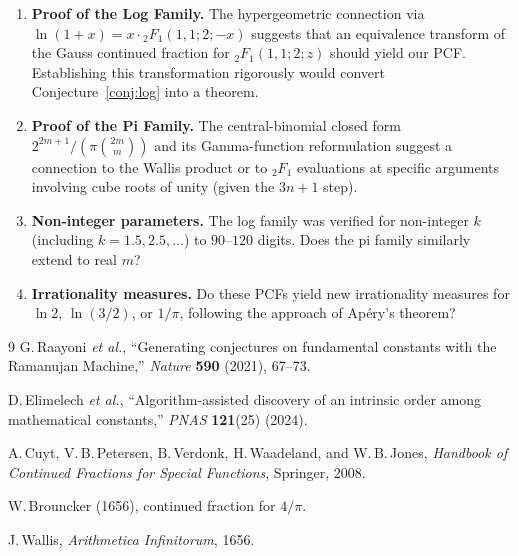 \documentclass[11pt]{article}
\begin{document}
\begin{enumerate}
\item \textbf{Proof of the Log Family.}
The hypergeometric connection via $\ln(1+x) = x \cdot {}_2F_1(1,1;2;-x)$
suggests that an equivalence transform of the Gauss continued fraction
for ${}_2F_1(1,1;2;z)$ should yield our PCF. Establishing this transformation
rigorously would convert Conjecture~\ref{conj:log} into a theorem.

\item \textbf{Proof of the Pi Family.}
The central-binomial closed form $2^{2m+1}/(\pi\binom{2m}{m})$
and its Gamma-function reformulation suggest a connection to the
Wallis product or to ${}_2F_1$ evaluations at specific arguments
involving cube roots of unity (given the $3n+1$ step).

\item \textbf{Non-integer parameters.}
The log family was verified for non-integer $k$ (including $k = 1.5, 2.5, \ldots$)
to $90$--$120$ digits. Does the pi family similarly extend to real $m$?

\item \textbf{Irrationality measures.}
Do these PCFs yield new irrationality measures for $\ln 2$, $\ln(3/2)$,
or $1/\pi$, following the approach of Ap\'{e}ry's theorem?
\end{enumerate}

\begin{thebibliography}{9}
G.\,Raayoni \textit{et al.},
``Generating conjectures on fundamental constants with the Ramanujan Machine,''
\textit{Nature} \textbf{590} (2021), 67--73.

D.\,Elimelech \textit{et al.},
``Algorithm-assisted discovery of an intrinsic order among mathematical constants,''
\textit{PNAS} \textbf{121}(25) (2024).

A.\,Cuyt, V.\,B.\,Petersen, B.\,Verdonk, H.\,Waadeland, and W.\,B.\,Jones,
\textit{Handbook of Continued Fractions for Special Functions},
Springer, 2008.

W.\,Brouncker (1656), continued fraction for $4/\pi$.

J.\,Wallis, \textit{Arithmetica Infinitorum}, 1656.
\end{thebibliography}
\end{document}
